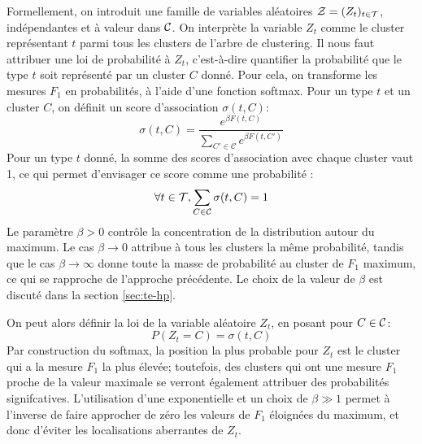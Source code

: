 Formellement, on introduit une famille de variables aléatoires $\cal{Z} = (Z_t)_{t \in \Types}$, indépendantes et à valeur dans $\Clusters$. On interprète la variable $Z_t$ comme le cluster représentant $t$ parmi tous les clusters de l'arbre de clustering. Il nous faut attribuer une loi de probabilité à $Z_t$, c'est-à-dire quantifier la probabilité que le type $t$ soit représenté par un cluster $C$ donné. Pour cela, on transforme les mesures $F_1$ en probabilités, à l'aide d'une fonction softmax. Pour un type $t$ et un cluster $C$, on définit un score d'association $\sigma(t, C)$:
\begin{equation}
    \sigma(t, C) = \frac{\displaystyle e^{ \beta F(t, C)}}{\displaystyle \sum_{C' \in \mathcal{C}} e^{\beta F(t, C')}}
\end{equation}
Pour un type $t$ donné, la somme des scores d'association avec chaque cluster vaut 1, ce qui permet d'envisager ce score comme une probabilité :
\begin{equation}
    \forall t \in \cal{T}, \sum_{C \in \cal{C}} \sigma(t, C) = 1
\end{equation}
Le paramètre $\beta > 0$ contrôle la concentration de la distribution autour du maximum. Le cas $\beta \rightarrow 0$ attribue à tous les clusters la même probabilité, tandis que le cas $\beta \rightarrow \infty$ donne toute la masse de probabilité au cluster de $F_1$ maximum, ce qui se rapproche de l'approche précédente. Le choix de la valeur de $\beta$ est discuté dans la section \ref{sec:te-hp}.

On peut alors définir la loi de la variable aléatoire $Z_t$, en posant pour $C \in \Clusters$:
\begin{equation}
    P(Z_t = C) = \sigma(t, C)
\end{equation}
Par construction du softmax, la position la plus probable pour $Z_t$ est le cluster qui a la mesure $F_1$ la plus élevée; toutefois, des clusters qui ont une mesure $F_1$ proche de la valeur maximale se verront également attribuer des probabilités signifcatives. L'utilisation d'une exponentielle et un choix de $\beta \gg 1$ permet à l'inverse de faire approcher de zéro les valeurs de $F_1$ éloignées du maximum, et donc d'éviter les localisations aberrantes de $Z_t$. 

